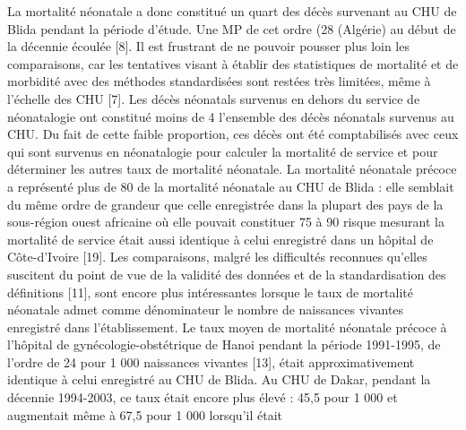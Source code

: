 La mortalité néonatale a donc constitué un quart des décès
survenant au CHU de Blida pendant la période d’étude. Une
MP de cet ordre (28 %
(Algérie) au début de la décennie écoulée [8]. Il est frustrant
de ne pouvoir pousser plus loin les comparaisons, car les
tentatives visant à établir des statistiques de mortalité et de
morbidité avec des méthodes standardisées sont restées très
limitées, même à l’échelle des CHU [7].
Les décès néonatals survenus en dehors du service de
néonatalogie ont constitué moins de 4 %
l’ensemble des décès néonatals survenus au CHU. Du fait
de cette faible proportion, ces décès ont été comptabilisés
avec ceux qui sont survenus en néonatalogie pour calculer
la mortalité de service et pour déterminer les autres taux de
mortalité néonatale.
La mortalité néonatale précoce a représenté plus de 80 %
de la mortalité néonatale au CHU de Blida : elle semblait du
même ordre de grandeur que celle enregistrée dans la plupart
des pays de la sous-région ouest africaine où elle pouvait
constituer 75 à 90 %
risque mesurant la mortalité de service était aussi identique à
celui enregistré dans un hôpital de Côte-d’Ivoire [19].
Les comparaisons, malgré les difficultés reconnues
qu’elles suscitent du point de vue de la validité des données
et de la standardisation des définitions [11], sont encore plus
intéressantes lorsque le taux de mortalité néonatale admet
comme dénominateur le nombre de naissances vivantes
enregistré dans l’établissement.
Le taux moyen de mortalité néonatale précoce à l’hôpital
de gynécologie-obstétrique de Hanoi pendant la période
1991-1995, de l’ordre de 24 pour 1 000 naissances vivantes
[13], était approximativement identique à celui enregistré au
CHU de Blida. Au CHU de Dakar, pendant la décennie
1994-2003, ce taux était encore plus élevé : 45,5 pour
1 000 et augmentait même à 67,5 pour 1 000 lorsqu’il était

